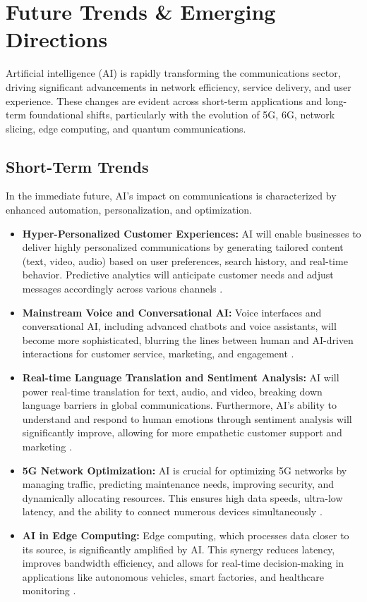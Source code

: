 \section{Future Trends \& Emerging Directions}

Artificial intelligence (AI) is rapidly transforming the communications sector, driving significant advancements in network efficiency, service delivery, and user experience. These changes are evident across short-term applications and long-term foundational shifts, particularly with the evolution of 5G, 6G, network slicing, edge computing, and quantum communications.

\subsection{Short-Term Trends}
In the immediate future, AI's impact on communications is characterized by enhanced automation, personalization, and optimization.
\begin{itemize}
    \item \textbf{Hyper-Personalized Customer Experiences:} AI will enable businesses to deliver highly personalized communications by generating tailored content (text, video, audio) based on user preferences, search history, and real-time behavior. Predictive analytics will anticipate customer needs and adjust messages accordingly across various channels \cite{ElationCommunications_FutureTrends, Comintime_FutureTrends}.
    \item \textbf{Mainstream Voice and Conversational AI:} Voice interfaces and conversational AI, including advanced chatbots and voice assistants, will become more sophisticated, blurring the lines between human and AI-driven interactions for customer service, marketing, and engagement \cite{ReadyNine_FutureTrends, AMWorldGroup_FutureTrends}.
    \item \textbf{Real-time Language Translation and Sentiment Analysis:} AI will power real-time translation for text, audio, and video, breaking down language barriers in global communications. Furthermore, AI's ability to understand and respond to human emotions through sentiment analysis will significantly improve, allowing for more empathetic customer support and marketing \cite{ElationCommunications_FutureTrends}.
    \item \textbf{5G Network Optimization:} AI is crucial for optimizing 5G networks by managing traffic, predicting maintenance needs, improving security, and dynamically allocating resources. This ensures high data speeds, ultra-low latency, and the ability to connect numerous devices simultaneously \cite{NI_FutureTrends, Boingo_FutureTrends}.
    \item \textbf{AI in Edge Computing:} Edge computing, which processes data closer to its source, is significantly amplified by AI. This synergy reduces latency, improves bandwidth efficiency, and allows for real-time decision-making in applications like autonomous vehicles, smart factories, and healthcare monitoring \cite{IoTForAll_FutureTrends, Flexential_FutureTrends}.
\end{itemize}

